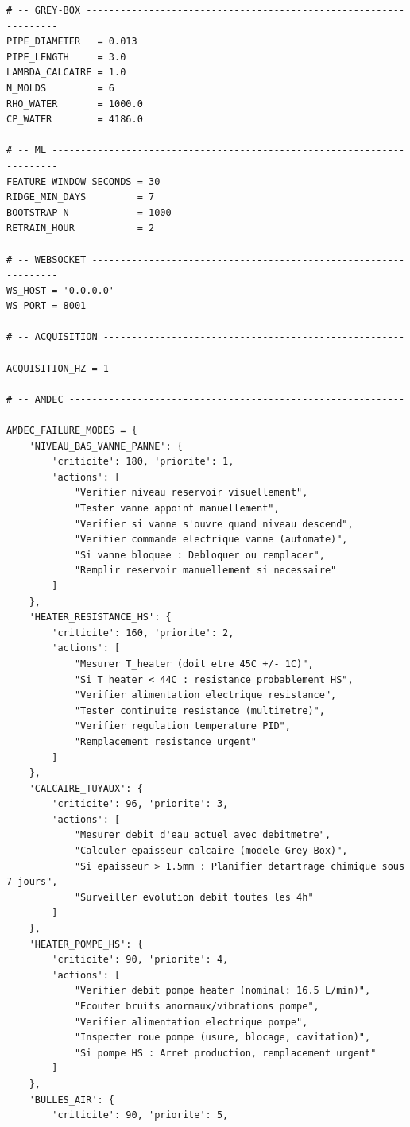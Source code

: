\begin{lstlisting}
# -- GREY-BOX -----------------------------------------------------------------
PIPE_DIAMETER   = 0.013
PIPE_LENGTH     = 3.0
LAMBDA_CALCAIRE = 1.0
N_MOLDS         = 6
RHO_WATER       = 1000.0
CP_WATER        = 4186.0

# -- ML -----------------------------------------------------------------------
FEATURE_WINDOW_SECONDS = 30
RIDGE_MIN_DAYS         = 7
BOOTSTRAP_N            = 1000
RETRAIN_HOUR           = 2

# -- WEBSOCKET ----------------------------------------------------------------
WS_HOST = '0.0.0.0'
WS_PORT = 8001

# -- ACQUISITION --------------------------------------------------------------
ACQUISITION_HZ = 1

# -- AMDEC --------------------------------------------------------------------
AMDEC_FAILURE_MODES = {
    'NIVEAU_BAS_VANNE_PANNE': {
        'criticite': 180, 'priorite': 1,
        'actions': [
            "Verifier niveau reservoir visuellement",
            "Tester vanne appoint manuellement",
            "Verifier si vanne s'ouvre quand niveau descend",
            "Verifier commande electrique vanne (automate)",
            "Si vanne bloquee : Debloquer ou remplacer",
            "Remplir reservoir manuellement si necessaire"
        ]
    },
    'HEATER_RESISTANCE_HS': {
        'criticite': 160, 'priorite': 2,
        'actions': [
            "Mesurer T_heater (doit etre 45C +/- 1C)",
            "Si T_heater < 44C : resistance probablement HS",
            "Verifier alimentation electrique resistance",
            "Tester continuite resistance (multimetre)",
            "Verifier regulation temperature PID",
            "Remplacement resistance urgent"
        ]
    },
    'CALCAIRE_TUYAUX': {
        'criticite': 96, 'priorite': 3,
        'actions': [
            "Mesurer debit d'eau actuel avec debitmetre",
            "Calculer epaisseur calcaire (modele Grey-Box)",
            "Si epaisseur > 1.5mm : Planifier detartrage chimique sous 7 jours",
            "Surveiller evolution debit toutes les 4h"
        ]
    },
    'HEATER_POMPE_HS': {
        'criticite': 90, 'priorite': 4,
        'actions': [
            "Verifier debit pompe heater (nominal: 16.5 L/min)",
            "Ecouter bruits anormaux/vibrations pompe",
            "Verifier alimentation electrique pompe",
            "Inspecter roue pompe (usure, blocage, cavitation)",
            "Si pompe HS : Arret production, remplacement urgent"
        ]
    },
    'BULLES_AIR': {
        'criticite': 90, 'priorite': 5,

\end{lstlisting}
